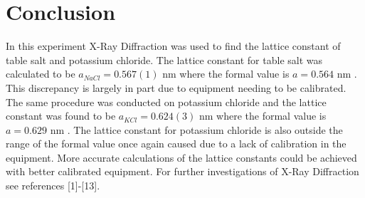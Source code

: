 \documentclass[twocolumn]{article}
\begin{document}
\section*{Conclusion}
In this experiment X-Ray Diffraction was used to find the lattice constant of table salt and potassium chloride. The lattice constant for table salt was calculated to be $a_{NaCl}=0.567(1)$ nm where the formal value is $a=0.564$ nm \cite{WikiLattice}. This discrepancy is largely in part due to equipment needing to be calibrated. The same procedure was conducted on potassium chloride and the lattice constant was found to be $a_{KCl}=0.624(3)$ nm where the formal value is  $a=0.629$ nm \cite{WikiLattice}. The lattice constant for potassium chloride is also outside the range of the formal value once again caused due to a lack of calibration in the equipment. More accurate calculations of the lattice constants could be achieved with better calibrated equipment. For further investigations of X-Ray Diffraction see references [1]-[13].
\newpage
\end{document}
